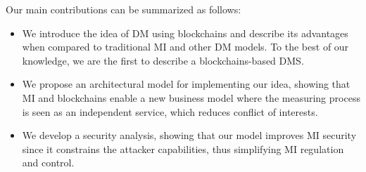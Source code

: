\documentclass[conference]{IEEEtran}
\begin{document}
Our main contributions can be summarized as follows:
\begin{itemize}
 \item We introduce the idea of DM using blockchains and describe its advantages when compared to traditional MI and other DM models. To the best of our knowledge, we are the first to describe a blockchains-based DMS.
 \item We propose an architectural model for implementing our idea, showing that MI and blockchains enable a new business model where the measuring process is seen as an independent service, which reduces conflict of interests.
 \item We develop a security analysis, showing that our model improves MI security since it constrains the attacker capabilities, thus simplifying MI regulation and control.
\end{itemize}


\end{document}
